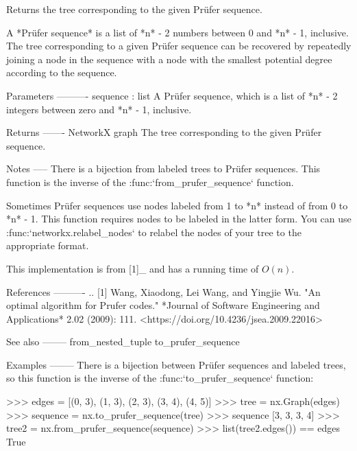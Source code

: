 \begin{DoxyVerb}Returns the tree corresponding to the given Prüfer sequence.

A *Prüfer sequence* is a list of *n* - 2 numbers between 0 and
*n* - 1, inclusive. The tree corresponding to a given Prüfer
sequence can be recovered by repeatedly joining a node in the
sequence with a node with the smallest potential degree according to
the sequence.

Parameters
----------
sequence : list
    A Prüfer sequence, which is a list of *n* - 2 integers between
    zero and *n* - 1, inclusive.

Returns
-------
NetworkX graph
    The tree corresponding to the given Prüfer sequence.

Notes
-----
There is a bijection from labeled trees to Prüfer sequences. This
function is the inverse of the :func:`from_prufer_sequence` function.

Sometimes Prüfer sequences use nodes labeled from 1 to *n* instead
of from 0 to *n* - 1. This function requires nodes to be labeled in
the latter form. You can use :func:`networkx.relabel_nodes` to
relabel the nodes of your tree to the appropriate format.

This implementation is from [1]_ and has a running time of
$O(n)$.

References
----------
.. [1] Wang, Xiaodong, Lei Wang, and Yingjie Wu.
       "An optimal algorithm for Prufer codes."
       *Journal of Software Engineering and Applications* 2.02 (2009): 111.
       <https://doi.org/10.4236/jsea.2009.22016>

See also
--------
from_nested_tuple
to_prufer_sequence

Examples
--------
There is a bijection between Prüfer sequences and labeled trees, so
this function is the inverse of the :func:`to_prufer_sequence`
function:

>>> edges = [(0, 3), (1, 3), (2, 3), (3, 4), (4, 5)]
>>> tree = nx.Graph(edges)
>>> sequence = nx.to_prufer_sequence(tree)
>>> sequence
[3, 3, 3, 4]
>>> tree2 = nx.from_prufer_sequence(sequence)
>>> list(tree2.edges()) == edges
True\end{DoxyVerb}
 \mbox{\label{namespacenetworkx_1_1algorithms_1_1tree_1_1coding_a3dc54058ee94eb611a8d06e54240ff76}} 
